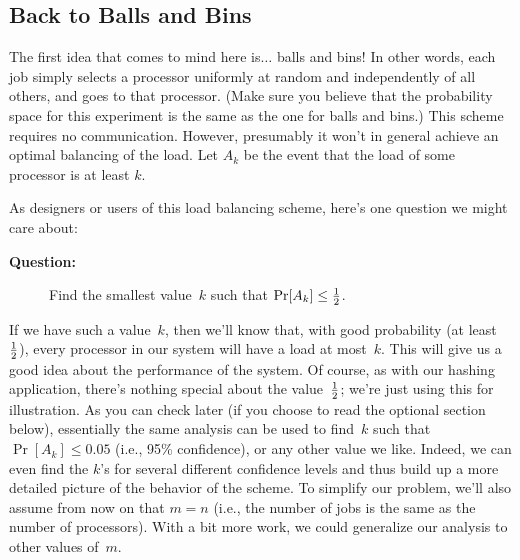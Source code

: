 \documentclass[11pt]{article}
\def\half{{\textstyle{1\over 2}}}
\begin{document}
\subsection*{Back to Balls and Bins}
The first idea that comes to mind here is$\ldots$ balls and bins!  
In other words, each job simply selects a processor uniformly at random and
independently of all others, and goes to that processor.  (Make sure
you believe that the probability space for this experiment is
the same as the one for balls and bins.)
This scheme requires no communication.  However,
presumably it won't in general achieve an optimal balancing of
the load.  Let $A_k$ be the event that the load of 
some processor is at least $k$. 
\iffalse
Let $X$ be the maximum loading of any processor under
our randomized scheme.  Note that $X$ isn't a fixed number:
its value depends on the outcome of our balls and bins 
experiment.\footnote{In fact, $X$ is called a \define{random variable}: 
we'll define this properly in the next lecture.}  
\fi
As designers or users of this
load balancing scheme, here's one question we might care about:
\begin{description}
\item[{\bf Question:}] Find the smallest value~$k$ such that
$\Pr[A_k] \le \half$.
\end{description}

If we have such a value~$k$, then we'll know that, with good probability
(at least~$\half$), every processor in our system will have a load at most~$k$.  
This will give us a good idea about
the performance of the system.  Of course, as with our hashing application,
there's nothing special about the value~$\half$; we're just using this
for illustration.  As you can check later (if you choose to read the optional section below), essentially the same
analysis can be used to find~$k$ such that $\Pr[A_k]\le 0.05$
(i.e., 95\% confidence), or any other value we like.  Indeed, we
can even find the $k$'s for several different confidence levels
and thus build up a more detailed picture of the behavior of the
scheme.  To simplify our problem, we'll
also assume from now on that $m=n$ (i.e., the number of jobs is
the same as the number of processors).  With a bit more work, we could
generalize our analysis to other values of~$m$.  
\end{document}
